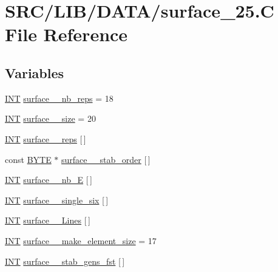 \hypertarget{surface__25_8_c}{}\section{S\+R\+C/\+L\+I\+B/\+D\+A\+T\+A/surface\+\_\+25.C File Reference}
\label{surface__25_8_c}
\subsection*{Variables}
\begin{DoxyCompactItemize}
\item 
\mbox{\hyperlink{galois_8h_a09fddde158a3a20bd2dcadb609de11dc}{I\+NT}} \mbox{\hyperlink{surface__25_8_c_ade40879d6d922c2eaca531e97fdf2224}{surface\+\_\+\_\+nb\+\_\+reps}} = 18
\item 
\mbox{\hyperlink{galois_8h_a09fddde158a3a20bd2dcadb609de11dc}{I\+NT}} \mbox{\hyperlink{surface__25_8_c_a205641b28b7d23e595dc307e6028bc9e}{surface\+\_\+\_\+size}} = 20
\item 
\mbox{\hyperlink{galois_8h_a09fddde158a3a20bd2dcadb609de11dc}{I\+NT}} \mbox{\hyperlink{surface__25_8_c_a7638a83435fd861f7ee8bf14ccce639a}{surface\+\_\+\_\+reps}} \mbox{[}$\,$\mbox{]}
\item 
const \mbox{\hyperlink{galois_8h_ab6cc7b4aeb6ea31aba2b3fbfc83ff5e6}{B\+Y\+TE}} $\ast$ \mbox{\hyperlink{surface__25_8_c_a8f05729dcb334e37ce275a2b8bf52f0c}{surface\+\_\+\_\+stab\+\_\+order}} \mbox{[}$\,$\mbox{]}
\item 
\mbox{\hyperlink{galois_8h_a09fddde158a3a20bd2dcadb609de11dc}{I\+NT}} \mbox{\hyperlink{surface__25_8_c_ab30cd053dc8abf4fd90fcfbac1ca6951}{surface\+\_\+\_\+nb\+\_\+E}} \mbox{[}$\,$\mbox{]}
\item 
\mbox{\hyperlink{galois_8h_a09fddde158a3a20bd2dcadb609de11dc}{I\+NT}} \mbox{\hyperlink{surface__25_8_c_ac99d5954a49ee326a414d86cb15489e0}{surface\+\_\+\_\+single\+\_\+six}} \mbox{[}$\,$\mbox{]}
\item 
\mbox{\hyperlink{galois_8h_a09fddde158a3a20bd2dcadb609de11dc}{I\+NT}} \mbox{\hyperlink{surface__25_8_c_af389c97391f2b1ea30684ca37f54fc3c}{surface\+\_\+\_\+\+Lines}} \mbox{[}$\,$\mbox{]}
\item 
\mbox{\hyperlink{galois_8h_a09fddde158a3a20bd2dcadb609de11dc}{I\+NT}} \mbox{\hyperlink{surface__25_8_c_a108306d74edec3e201774301ca7bbec0}{surface\+\_\+\_\+make\+\_\+element\+\_\+size}} = 17
\item 
\mbox{\hyperlink{galois_8h_a09fddde158a3a20bd2dcadb609de11dc}{I\+NT}} \mbox{\hyperlink{surface__25_8_c_a15eff2145d28e9d0b1e4b06b9f630391}{surface\+\_\+\_\+stab\+\_\+gens\+\_\+fst}} \mbox{[}$\,$\mbox{]}

\end{DoxyCompactItemize}
